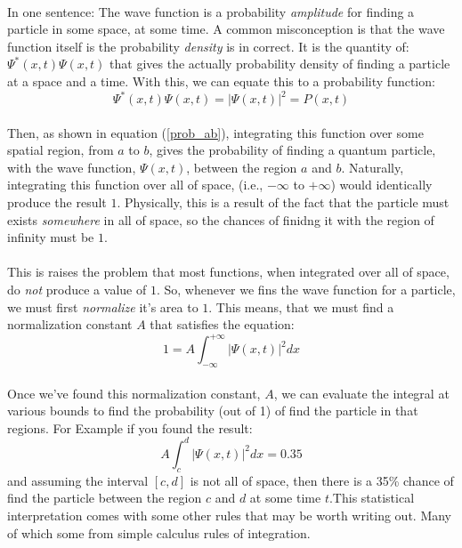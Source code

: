 \documentclass[12pt,letterpaper]{book}
\begin{document}
\paragraph*{}In one sentence: The wave function is a probability \textit{amplitude} for finding a particle in some space, at some time. A common misconception is that the wave function itself is the probability \textit{density} is in correct. It is the quantity of: $\Psi^*(x,t) \Psi(x,t)$ that gives the actually probability density of finding a particle at a space and a time. With this, we can equate this to a probability function:
\begin{equation}
\label{prob density func}
\Psi^*(x,t) \Psi(x,t) = \big | \Psi(x,t) \big|^2 = P(x,t)
\end{equation}
\paragraph*{}Then, as shown in equation (\ref{prob_ab}), integrating this function over some spatial region, from $a$ to $b$, gives the probability of finding a quantum particle, with the wave function, $\Psi(x,t)$, between the region $a$ and $b$. Naturally, integrating this function over all of space, (i.e., $-\infty$ to $+\infty$) would identically produce the result $1$. Physically, this is a result of the fact that the particle must exists \textit{somewhere} in all of space, so the chances of finidng it with the region of infinity must be $1$.
\paragraph*{}This is raises the problem  that most functions, when integrated over all of space, do \textit{not} produce a value of $1$. So, whenever we fins the wave function for a particle, we must first \textit{normalize} it's area to $1$. This means, that we must find a normalization constant $A$ that satisfies the equation:
\begin{equation}
\label{normalize wave function}
1 = A\int_{-\infty}^{+\infty} \big | \Psi(x,t) \big|^2 dx
\end{equation}
\paragraph*{}Once we've found this normalization constant, $A$, we can evaluate the integral at various bounds to find the probability (out of 1) of find the particle in that regions. For Example if you found the result:
\begin{equation}
A\int_{c}^{d} \big | \Psi(x,t) \big|^2 dx = 0.35
\end{equation}
and assuming the interval $[c,d]$ is not all of space, then there is a 35\% chance of find the particle between the region $c$ and $d$ at some time $t$.This statistical interpretation comes with some other rules that may be worth writing out. Many of which some from simple calculus rules of integration.
\end{document}
